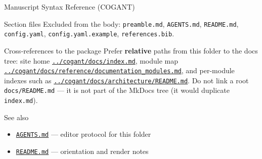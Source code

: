 \documentclass[
  ignorenonframetext,
]{beamer}
\providecommand{\tightlist}{%
  \setlength{\itemsep}{0pt}\setlength{\parskip}{0pt}}
\begin{document}
\begin{frame}[fragile]{Manuscript Syntax Reference (COGANT)}
\begin{block}{Section files}
Excluded from the body: \texttt{preamble.md}, \texttt{AGENTS.md},
\texttt{README.md}, \texttt{config.yaml}, \texttt{config.yaml.example},
\texttt{references.bib}.
\end{block}

\begin{block}{Cross-references to the package}
\protect{}\label{cross-references-to-the-package}
Prefer \textbf{relative} paths from this folder to the docs tree: site
home \href{../cogant/docs/index.md}{\texttt{../cogant/docs/index.md}},
module map
\href{../cogant/docs/reference/documentation_modules.md}{\texttt{../cogant/docs/reference/documentation\_modules.md}},
and per-module indexes such as
\href{../cogant/docs/architecture/README.md}{\texttt{../cogant/docs/architecture/README.md}}.
Do not link a root \texttt{docs/README.md} --- it is not part of the
MkDocs tree (it would duplicate \texttt{index.md}).
\end{block}

\begin{block}{See also}
\protect{}\label{see-also}
\begin{itemize}
\tightlist
\item
  \href{AGENTS.md}{\texttt{AGENTS.md}} --- editor protocol for this
  folder
\item
  \href{README.md}{\texttt{README.md}} --- orientation and render notes
\end{itemize}
\end{block}
\end{frame}
\end{document}
